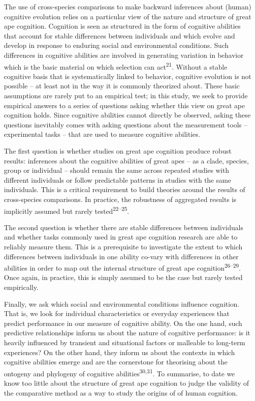 \documentclass[
  man,floatsintext]{apa6}
\begin{document}
The use of cross-species comparisons to make backward inferences about (human) cognitive evolution relies on a particular view of the nature and structure of great ape cognition. Cognition is seen as structured in the form of cognitive abilities that account for stable differences between individuals and which evolve and develop in response to enduring social and environmental conditions. Such differences in cognitive abilities are involved in generating variation in behavior which is the basic material on which selection can act\textsuperscript{21}. Without a stable cognitive basis that is systematically linked to behavior, cognitive evolution is not possible -- at least not in the way it is commonly theorized about. These basic assumptions are rarely put to an empirical test; in this study, we seek to provide empirical answers to a series of questions asking whether this view on great ape cognition holds. Since cognitive abilities cannot directly be observed, asking these questions inevitably comes with asking questions about the measurement tools -- experimental tasks -- that are used to measure cognitive abilities.

The first question is whether studies on great ape cognition produce robust results: inferences about the cognitive abilities of great apes -- as a clade, species, group or individual -- should remain the same across repeated studies with different individuals or follow predictable patterns in studies with the same individuals. This is a critical requirement to build theories around the results of cross-species comparisons. In practice, the robustness of aggregated results is implicitly assumed but rarely tested\textsuperscript{22--25}.

The second question is whether there are stable differences between individuals and whether tasks commonly used in great ape cognition research are able to reliably measure them. This is a prerequisite to investigate the extent to which differences between individuals in one ability co-vary with differences in other abilities in order to map out the internal structure of great ape cognition\textsuperscript{26--29}. Once again, in practice, this is simply assumed to be the case but rarely tested empirically.

Finally, we ask which social and environmental conditions influence cognition. That is, we look for individual characteristics or everyday experiences that predict performance in our measure of cognitive ability. On the one hand, such predictive relationships inform us about the nature of cognitive performance: is it heavily influenced by transient and situational factors or malleable to long-term experiences? On the other hand, they inform us about the contexts in which cognitive abilities emerge and are the cornerstone for theorising about the ontogeny and phylogeny of cognitive abilities\textsuperscript{30,31}. To summarise, to date we know too little about the structure of great ape cognition to judge the validity of the comparative method as a way to study the origins of of human cognition.
\end{document}
